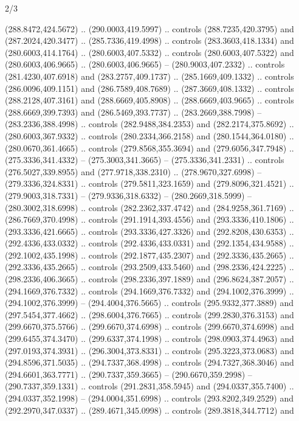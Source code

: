\begin{flagdescription}{2/3}
\begin{scope}[xshift=0.5\flaglength,yshift=0.5\flagwidth,scale=\flagwidth/525.28]
\begin{scope}[y=0.1mm, x=0.1mm, yscale=-1,shift={(-381.5,-404)}]
\begin{scope}[shift={(5.25001,4.53053)},miter limit=4.00,line width=0.800\lw]
  (288.8472,424.5672) .. (290.0003,419.5997) .. controls (288.7235,420.3795) and
  (287.2024,420.3477) .. (285.7336,419.4998) .. controls (283.3603,418.1334) and
  (280.6003,414.1764) .. (280.6003,407.5332) .. controls (280.6003,407.5322) and
  (280.6003,406.9665) .. (280.6003,406.9665) -- (280.9003,407.2332) .. controls
  (281.4230,407.6918) and (283.2757,409.1737) .. (285.1669,409.1332) .. controls
  (286.0096,409.1151) and (286.7589,408.7689) .. (287.3669,408.1332) .. controls
  (288.2128,407.3161) and (288.6669,405.8908) .. (288.6669,403.9665) .. controls
  (288.6669,399.7393) and (286.5469,393.7737) .. (283.2669,388.7998) --
  (283.2336,388.4998) .. controls (282.9488,384.2353) and (282.2174,375.8692) ..
  (280.6003,367.9332) .. controls (280.2334,366.2158) and (280.1544,364.0180) ..
  (280.0670,361.4665) .. controls (279.8568,355.3694) and (279.6056,347.7948) ..
  (275.3336,341.4332) -- (275.3003,341.3665) -- (275.3336,341.2331) .. controls
  (276.5027,339.8955) and (277.9718,338.2310) .. (278.9670,327.6998) --
  (279.3336,324.8331) .. controls (279.5811,323.1659) and (279.8096,321.4521) ..
  (279.9003,318.7331) -- (279.9336,318.6332) -- (280.2669,318.5999) --
  (280.3002,318.6998) .. controls (282.2362,337.4742) and (284.9258,361.7169) ..
  (286.7669,370.4998) .. controls (291.1914,393.4556) and (293.3336,410.1806) ..
  (293.3336,421.6665) .. controls (293.3336,427.3326) and (292.8208,430.6353) ..
  (292.4336,433.0332) .. controls (292.4336,433.0331) and (292.1354,434.9588) ..
  (292.1002,435.1998) .. controls (292.1877,435.2307) and (292.3336,435.2665) ..
  (292.3336,435.2665) .. controls (293.2509,433.5460) and (298.2336,424.2225) ..
  (298.2336,406.3665) .. controls (298.2336,397.1889) and (296.8624,387.2057) ..
  (294.1669,376.7332) .. controls (294.1669,376.7332) and (294.1002,376.3999) ..
  (294.1002,376.3999) -- (294.4004,376.5665) .. controls (295.9332,377.3889) and
  (297.5454,377.4662) .. (298.6004,376.7665) .. controls (299.2830,376.3153) and
  (299.6670,375.5766) .. (299.6670,374.6998) .. controls (299.6670,374.6998) and
  (299.6455,374.3470) .. (299.6337,374.1998) .. controls (298.0903,374.4963) and
  (297.0193,374.3931) .. (296.3004,373.8331) .. controls (295.3223,373.0683) and
  (294.8596,371.5035) .. (294.7337,368.4998) .. controls (294.7327,368.3046) and
  (294.6601,363.7771) .. (290.7337,359.3665) -- (290.6670,359.2998) --
  (290.7337,359.1331) .. controls (291.2831,358.5945) and (294.0337,355.7400) ..
  (294.0337,352.1998) -- (294.0004,351.6998) .. controls (293.8202,349.2529) and
  (292.2970,347.0337) .. (289.4671,345.0998) .. controls (289.3818,344.7712) and

\end{scope}
\end{scope}
\end{scope}
\end{flagdescription}
